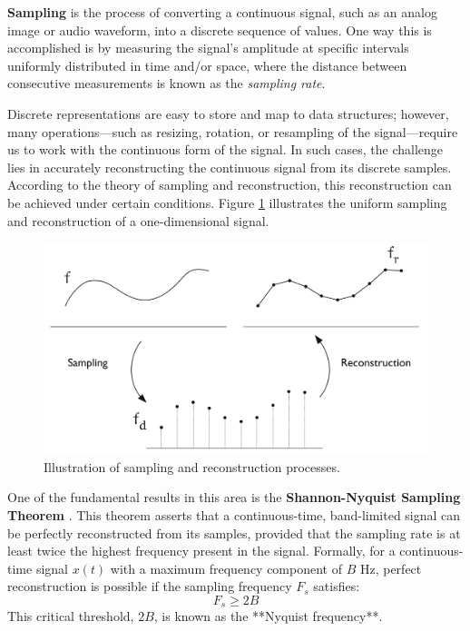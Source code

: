 \textbf{Sampling} is the process of converting a continuous signal, such as an analog image or audio waveform, into a discrete sequence of values. One way this is accomplished is by measuring the signal's amplitude at specific intervals uniformly distributed in time and/or space, where the distance between consecutive measurements is known as the \textit{sampling rate}.

Discrete representations are easy to store and map to data structures; however, many operations—such as resizing, rotation, or resampling of the signal—require us to work with the continuous form of the signal. In such cases, the challenge lies in accurately reconstructing the continuous signal from its discrete samples. According to the theory of sampling and reconstruction, this reconstruction can be achieved under certain conditions. Figure \ref{f:sampling-reconstuction} illustrates the uniform sampling and reconstruction of a one-dimensional signal.


\begin{figure}[!h]
  \centering
  \includegraphics[width=0.85\linewidth]{img/ch2/sampling-reconstruction.png}
  \caption{Illustration of sampling and reconstruction processes.}
  \label{f:sampling-reconstuction}
\end{figure}


One of the fundamental results in this area is the \textbf{Shannon-Nyquist Sampling Theorem} \cite{Shannon1949}. This theorem asserts that a continuous-time, band-limited signal can be perfectly reconstructed from its samples, provided that the sampling rate is at least twice the highest frequency present in the signal. Formally, for a continuous-time signal \( x(t) \) with a maximum frequency component of \( B \) Hz, perfect reconstruction is possible if the sampling frequency \( F_s \) satisfies:
\[
F_s \geq 2B
\]
This critical threshold, \( 2B \), is known as the **Nyquist frequency**.

